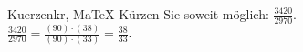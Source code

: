 \begin{MAufgabe}{Kuerzen}{kr, MaTeX}
K\"urzen Sie soweit m\"oglich: $\frac{3420}{2970}$.\\ 
\ifLsg\MLoesung
\quad $\frac{3420}{2970}=\frac{(90)\cdot(38)}{(90)\cdot(33)}=\frac{38}{33}$.\else\relax\fi
 \end{MAufgabe}